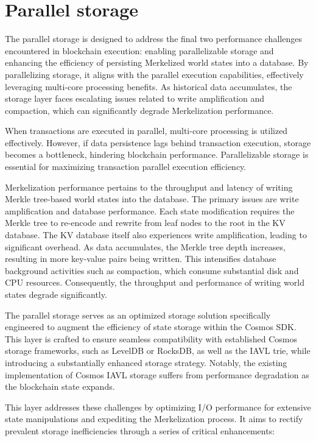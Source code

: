 \section{Parallel storage}

The parallel storage is designed to address the final two performance challenges encountered in blockchain execution: enabling parallelizable storage and enhancing the efficiency of persisting Merkelized world states into a database. By parallelizing storage, it aligns with the parallel execution capabilities, effectively leveraging multi-core processing benefits. As historical data accumulates, the storage layer faces escalating issues related to write amplification and compaction, which can significantly degrade Merkelization performance.

When transactions are executed in parallel, multi-core processing is utilized effectively. However, if data persistence lags behind transaction execution, storage becomes a bottleneck, hindering blockchain performance. Parallelizable storage is essential for maximizing transaction parallel execution efficiency.

Merkelization performance pertains to the throughput and latency of writing Merkle tree-based world states into the database. The primary issues are write amplification and database performance. Each state modification requires the Merkle tree to re-encode and rewrite from leaf nodes to the root in the KV database. The KV database itself also experiences write amplification, leading to significant overhead. As data accumulates, the Merkle tree depth increases, resulting in more key-value pairs being written. This intensifies database background activities such as compaction, which consume substantial disk and CPU resources. Consequently, the throughput and performance of writing world states degrade significantly.

The parallel storage serves as an optimized storage solution specifically engineered to augment the efficiency of state storage within the Cosmos SDK. This layer is crafted to ensure seamless compatibility with established Cosmos storage frameworks, such as LevelDB or RocksDB, as well as the IAVL trie\cite{cosmos_iavl}\cite{simmon_avl_trees}, while introducing a substantially enhanced storage strategy. Notably, the existing implementation of Cosmos IAVL storage suffers from performance degradation as the blockchain state expands.

This layer addresses these challenges by optimizing I/O performance for extensive state manipulations and expediting the Merkelization process. It aims to rectify prevalent storage inefficiencies through a series of critical enhancements:

